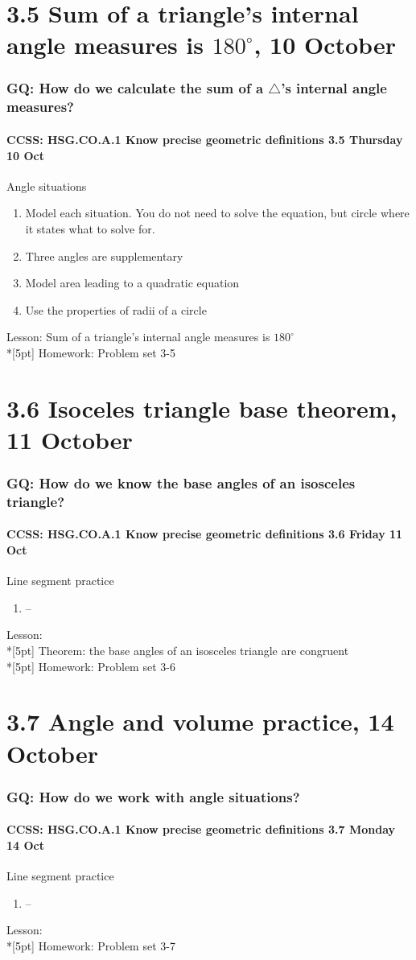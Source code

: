 \documentclass{beamer}
\begin{document}
  \section{3.5 Sum of a triangle's internal angle measures is $180^\circ$, 10 October}
    \frame
    {
      \frametitle{GQ: How do we calculate the sum of a $\triangle$'s internal angle measures?}
      \framesubtitle{CCSS: HSG.CO.A.1 Know precise geometric definitions \hfill \alert{3.5 Thursday 10 Oct}}

      \begin{block}{Angle situations}
      \begin{enumerate}
        \item Model each situation. You do not need to solve the equation, but circle where it states what to solve for.
        \item Three angles are supplementary
        \item Model area leading to a quadratic equation
        \item Use the properties of radii of a circle
      \end{enumerate}
      \end{block}
      Lesson: Sum of a triangle's internal angle measures is $180^\circ$ \\*[5pt]
      Homework: Problem set 3-5
    }

  \section{3.6 Isoceles triangle base theorem, 11 October}
    \frame
    {
      \frametitle{GQ: How do we know the base angles of an isosceles triangle?}
      \framesubtitle{CCSS: HSG.CO.A.1 Know precise geometric definitions \hfill \alert{3.6 Friday 11 Oct}}

      \begin{block}{Line segment practice}
      \begin{enumerate}
        \item --
      \end{enumerate}
      \end{block}
      Lesson:   \\*[5pt]
      Theorem: the base angles of an isosceles triangle are congruent\\*[5pt]
      Homework: Problem set 3-6
    }

  \section{3.7 Angle and volume practice, 14 October}
    \frame
    {
      \frametitle{GQ: How do we work with angle situations?}
      \framesubtitle{CCSS: HSG.CO.A.1 Know precise geometric definitions \hfill \alert{3.7 Monday 14 Oct}}

      \begin{block}{Line segment practice}
      \begin{enumerate}
        \item --
      \end{enumerate}
      \end{block}
      Lesson:   \\*[5pt]
      Homework: Problem set 3-7
    }
\end{document}
